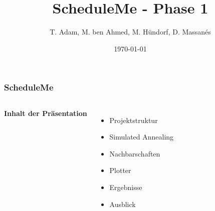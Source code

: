 \documentclass[aspectratio=169]{beamer}
\title[ScheduleMe]{ScheduleMe - Phase 1} %
\author{T. Adam, M. ben Ahmed, M. Hündorf, D. Massanés} %
\institute[UOS] %
{

Universität Osnabrück \\ %

\medskip
\textit{Ressourcenbeschränkte Projektplanung} %


}
\date{\today} %
\begin{document}
\begin{frame}
\titlepage %
\end{frame}




\begin{frame}
\frametitle{ScheduleMe}
\begin{columns}[c] %
	\centering
	\textbf{Inhalt der Präsentation}
	\begin{itemize}
		\item Projektstruktur
		\item Simulated Annealing
		\item Nachbarschaften
		\item Plotter
		\item Ergebnisse
		\item Ausblick
	\end{itemize}
	
\end{columns}
\end{frame}
\end{document}
